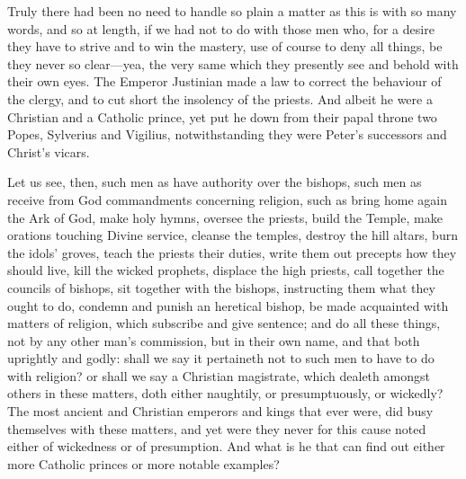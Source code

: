 Truly there had been no need to handle so plain a matter as this
is with so many words, and so at length, if we had not to do with those
men who, for a desire they have to strive and to win the mastery, use
of course to deny all things, be they never so clear—yea, the
very same which they presently see and behold with their own eyes.
The Emperor
Justinian made a law to correct the behaviour of the clergy, and to
cut short the insolency of the priests. And albeit he were a Christian
and a Catholic prince, yet put he down from their papal throne two Popes,
Sylverius and Vigilius, notwithstanding they were Peter’s successors
and Christ’s vicars.

Let us see, then, such men as have authority over the bishops, such
men as receive from God commandments concerning religion, such as bring
home again the Ark of God, make holy hymns, oversee the priests, build
the Temple, make orations touching Divine service, cleanse the temples,
destroy the hill altars, burn the idols’ groves, teach the priests
their duties, write them out precepts how they should live, kill the
wicked prophets, displace the high priests, call together the councils
of bishops, sit together with the bishops, instructing them what they
ought to do, condemn and punish an heretical bishop, be made acquainted
with matters of religion, which subscribe and give sentence; and do
all these things, not by any other man’s commission, but in their
own name, and that both uprightly and godly: shall we say it pertaineth
not to such men to have to do with religion? or shall we say a Christian
magistrate, which dealeth amongst others
in these matters, doth either naughtily, or presumptuously, or wickedly?
The most ancient and Christian emperors and kings that ever were, did
busy themselves with these matters, and yet were they never for this
cause noted either of wickedness or of presumption. And what is
he that can find out either more Catholic princes or more notable examples?

